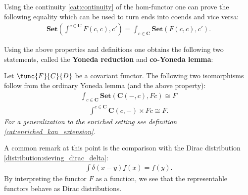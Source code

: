     \begin{property}
        Using the continuity \ref{cat:continuity} of the hom-functor one can prove the following equality which can be used to turn ends into coends and vice versa:
        \begin{gather}
            \mathbf{Set}\left(\int^{c\in\mathbf{C}}F(c, c), c'\right) = \int_{c\in\mathbf{C}}\mathbf{Set}\left(F(c, c), c'\right).
        \end{gather}
    \end{property}

    Using the above properties and definitions one obtains the following two statements, called the \textbf{Yoneda reduction} and \textbf{co-Yoneda lemma}:
    \begin{theorem}\label{cat:ninja_yoneda}
        Let $\func{F}{C}{D}$ be a covariant functor. The following two isomorphisms follow from the ordinary Yoneda lemma (and the above property):
        \begin{gather}
            \int_{c\in\mathbf{C}}\mathbf{Set}\left(\mathbf{C}(-, c), Fc\right)\cong F
        \end{gather}
        \begin{gather}
            \int^{c\in\mathbf{C}}\mathbf{C}(c, -)\times Fc\cong F.
        \end{gather}
        \emph{For a generalization to the enriched setting see definition \ref{cat:enriched_kan_extension}.}
    \end{theorem}
    \begin{remark}
        A common remark at this point is the comparison with the Dirac distribution \ref{distribution:sieving_dirac_delta}:
        \begin{gather}
            \int \delta(x-y)f(x) = f(y).
        \end{gather}
        By interpreting the functor $F$ as a function, we see that the representable functors behave as Dirac distributions.
    \end{remark}

